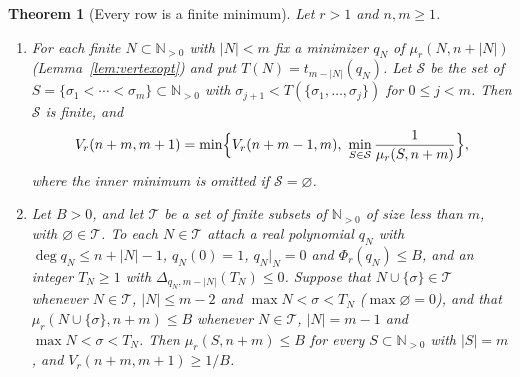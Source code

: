 \documentclass[11pt]{article}
\newtheorem{theorem}{Theorem}[section]
\newcommand{\N}{\mathbb N}
\begin{document}
\begin{theorem}[Every row is a finite minimum]\label{thm:finiterows}
Let $r>1$ and $n,m\ge1$.
\begin{enumerate}
\item[(a)] For each finite $N\subset\N_{>0}$ with $|N|<m$ fix a minimizer
$q_N$ of $\mu_r(N,n+|N|)$ (Lemma~\ref{lem:vertexopt}) and put
$T(N)=t_{m-|N|}(q_N)$.  Let $\mathcal S$ be the set of
$S=\{\sigma_1<\cdots<\sigma_m\}\subset\N_{>0}$ with
$\sigma_{j+1}<T(\{\sigma_1,\ldots,\sigma_j\})$ for $0\le j<m$.  Then
$\mathcal S$ is finite, and
\[
  V_r(n+m,m+1)=\min\Bigl\{V_r(n+m-1,m),\
  \min_{S\in\mathcal S}\frac1{\mu_r(S,n+m)}\Bigr\},
\]
where the inner minimum is omitted if $\mathcal S=\varnothing$.
\item[(b)] Let $B>0$, and let $\mathcal T$ be a set of finite subsets of
$\N_{>0}$ of size less than $m$, with $\varnothing\in\mathcal T$.  To each
$N\in\mathcal T$ attach a real polynomial $q_N$ with $\deg q_N\le n+|N|-1$,
$q_N(0)=1$, $q_N|_N=0$ and $\Phi_r(q_N)\le B$, and an integer $T_N\ge1$ with
$\Delta_{q_N,m-|N|}(T_N)\le0$.  Suppose that $N\cup\{\sigma\}\in\mathcal T$
whenever $N\in\mathcal T$, $|N|\le m-2$ and $\max N<\sigma<T_N$
($\max\varnothing=0$), and that $\mu_r(N\cup\{\sigma\},n+m)\le B$ whenever
$N\in\mathcal T$, $|N|=m-1$ and $\max N<\sigma<T_N$.  Then
$\mu_r(S,n+m)\le B$ for every $S\subset\N_{>0}$ with $|S|=m$, and
$V_r(n+m,m+1)\ge1/B$.
\end{enumerate}
\end{theorem}
\end{document}
